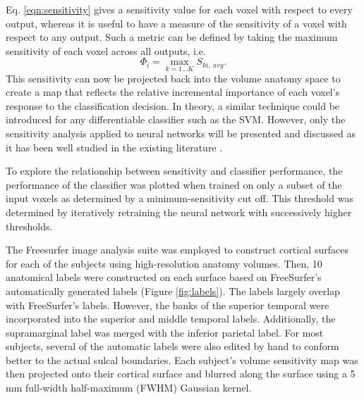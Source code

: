 \documentclass[5p,authoryear]{elsarticle}
\begin{document}
Eq. \ref{eqn:sensitivity} gives a sensitivity value for each voxel with respect to every output, whereas it is useful to have a measure of the sensitivity of a voxel with respect to any output.
Such a metric can be defined by taking the maximum sensitivity of each voxel across all outputs, i.e.
\begin{equation}
\Phi_{i} = \max_{k=1 \dots K}{S_{ki,~avg}}.
\end{equation}
This sensitivity can now be projected back into the volume anatomy space to create a  map that reflects the relative incremental importance of each voxel's response to the classification decision.
In theory, a similar technique could be introduced for any differentiable classifier such as the SVM.
However, only the sensitivity analysis applied to neural networks will be presented and discussed as it has been well studied in the existing literature \citep{Zurada1994}.

To  explore the relationship between sensitivity and classifier performance, the performance of the classifier was plotted when trained on only a subset of the input voxels as determined by a minimum-sensitivity cut off.
This threshold was determined by iteratively retraining the neural network with successively higher thresholds.

The Freesurfer image analysis suite was employed to construct cortical surfaces for each of the subjects using high-resolution anatomy volumes.
Then, 10 anatomical labels were constructed on each surface based on FreeSurfer's automatically generated labels (Figure \ref{fig:labels}).
The labels largely overlap with FreeSurfer's labels.
However, the banks of the superior temporal were incorporated into the superior and middle temporal labels.
Additionally, the supramarginal label was merged with the inferior parietal label.
For most subjects, several of the automatic labels were also edited by hand to conform better to the actual sulcal boundaries.
Each subject's volume sensitivity map was then projected onto their cortical surface and blurred along the surface using a 5 mm full-width half-maximum (FWHM) Gaussian kernel.
\end{document}
